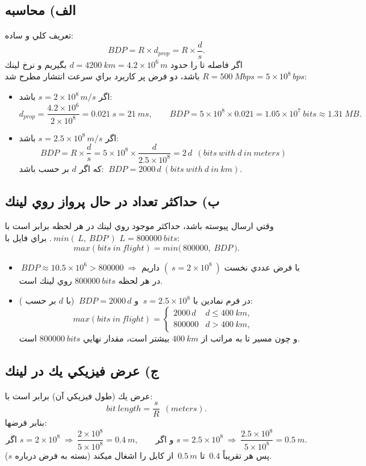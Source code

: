 \subsection{الف) محاسبه }
تعريف كلي و ساده:
\[
{BDP}= {R}\times {d_{\!prop}}= {R}\times\frac{{d}}{{s}}.
\]
اگر فاصله  تا  را حدود \({d}={4200~km}=4.2\times 10^{6}\,{m}\) بگيريم و نرخ لينك \({R}={500~Mbps}=5\times 10^{8}\,{bps}\) باشد، دو فرض پر كاربرد براي سرعت انتشار مطرح شد:
\begin{itemize}
  \item اگر \({s}=2\times 10^{8}\,{m/s}\) باشد:
  \[
  {d_{\!prop}}=\frac{4.2\times 10^{6}}{2\times 10^{8}}=0.021~{s}=21~{ms},\qquad
  {BDP}=5\times 10^{8}\times 0.021=1.05\times 10^{7}\ {bits}\approx 1.31\ {MB}.
  \]
  \item اگر \({s}=2.5\times 10^{8}\,{m/s}\) باشد:
  \[
  {BDP}={R}\times\frac{{d}}{{s}}=5\times 10^{8}\times\frac{{d}}{2.5\times 10^{8}}
  =2\,{d}\ \ ({bits\ with}\ {d}\ {in\ meters})
  \]
  كه اگر \({d}\) بر حسب  باشد: \(\ {BDP}=2000\,{d}\ ({bits\ with}\ {d}\ {in\ km})\).
\end{itemize}

\subsection{ب) حداكثر تعداد  در حال پرواز روي لينك}
وقتي ارسال پيوسته باشد، حداكثر  موجود روي لينك در هر لحظه برابر است با \(\ {min}(\,{L},\ {BDP}\,)\).
براي فايل با \({L}={800000~bits}\):
\[
{max(bits\ in\ flight)}={min}\big(\,{800000},\ {BDP}\,\big).
\]
\begin{itemize}
  \item با فرض عددي نخست \((\ {s}=2\times 10^{8}\ )\) داريم \(\ {BDP}\approx 10.5\times 10^{6}>{800000}\ \Rightarrow\)
  در هر لحظه \({800000}\ {bits}\) روي لينك است.
  \item در فرم نمادين با \(\ {s}=2.5\times 10^{8}\) و \(\ {BDP}=2000\,{d}\) (با \({d}\) بر حسب ):
  \[
  {max(bits\ in\ flight)}=
  \begin{cases}
  2000\,{d} & {d}\le 400\ {km},\\
  {800000}  & {d}> 400\ {km},
  \end{cases}
  \]
  و چون مسير  تا  به مراتب از \({400~km}\) بيشتر است، مقدار نهايي \({800000}\ {bits}\) است.
\end{itemize}

\subsection{ج) عرض فيزيكي يك  در لينك}
عرض يك  (طول فيزيكي آن) برابر است با:
\[
{bit\ length}=\frac{{s}}{{R}}\ \ ({meters}).
\]
بنابر فرضها:
\[
\text{اگر } {s}=2\times 10^{8}\ \Rightarrow\ \frac{2\times 10^{8}}{5\times 10^{8}}=0.4~{m},\qquad
\text{و اگر } {s}=2.5\times 10^{8}\ \Rightarrow\ \frac{2.5\times 10^{8}}{5\times 10^{8}}=0.5~{m}.
\]
پس هر  تقريباً \(\,0.4\) تا \(\,0.5\,{m}\) از كابل را اشغال ميكند (بسته به فرض درباره \({s}\)).

